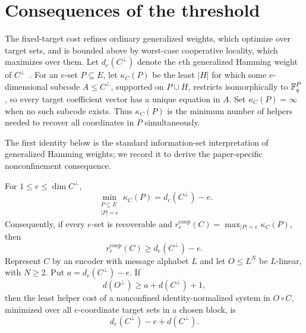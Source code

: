 \section{Consequences of the threshold}
\label{sec:consequences}

The fixed-target cost refines ordinary generalized weights, which optimize
over target sets, and is bounded above by worst-case cooperative locality,
which maximizes over them.  Let $d_e(C^\perp)$ denote the $e$th
generalized Hamming weight of $C^\perp$~\cite{Wei1991}.  For an $e$-set $P\subseteq E$, let
$\kappa_C(P)$ be the least $|H|$ for which some $e$-dimensional subcode
$A\leq C^\perp$, supported on $P\cup H$, restricts isomorphically to
$\mathbb F_q^P$, so every target coefficient vector has a unique equation in $A$.
Set $\kappa_C(P)=\infty$ when no such subcode exists.  Thus
$\kappa_C(P)$ is the minimum number of helpers needed to recover all
coordinates in $P$ simultaneously.

The first identity below is the standard information-set interpretation of
generalized Hamming weights; we record it to derive the paper-specific
nonconfinement consequence.

\begin{theorem}
\label{thm:best-target-ghw}
%
For $1\leq e\leq\dim C^\perp$,
\begin{equation}
 \min_{\substack{P\subseteq E\\|P|=e}}\kappa_C(P)
 =d_e(C^\perp)-e.
 \label{eq:best-target-ghw}
\end{equation}
Consequently, if every $e$-set is recoverable and
$r_e^{\mathrm{coop}}(C)=\max_{|P|=e}\kappa_C(P)$, then
\[
 r_e^{\mathrm{coop}}(C)\geq d_e(C^\perp)-e.
\]
Represent $C$ by an encoder with message alphabet $L$ and let $O\leq L^N$
be $L$-linear, with $N\geq2$.  Put $a=d_e(C^\perp)-e$.  If
\[
 d(O^\perp)\geq a+d(C^\perp)+1,
\]
then the least helper cost of a nonconfined identity-normalized system in
$O\circ C$, minimized over all $e$-coordinate target sets in a chosen block, is
\begin{equation}
 d_e(C^\perp)-e+d(C^\perp).
 \label{eq:best-target-escape}
\end{equation}
\end{theorem}

